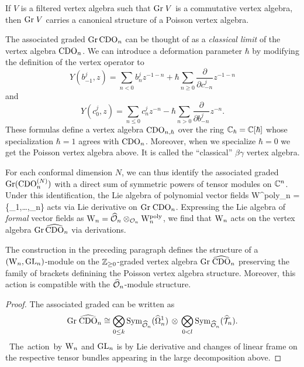 \begin{prop}
If $V$ is a filtered vertex algebra such that ${\rm Gr} \; V$ is a commutative vertex algebra,
then ${\rm Gr} \; V$ carries a canonical structure of a Poisson vertex algebra.
\end{prop}

\begin{rmk} 
The associated graded ${\rm Gr}\, {\rm CDO}_n$ can be thought of as a {\em classical limit} of the vertex algebra ${\rm CDO}_n$. 
We can introduce a deformation parameter $\hbar$ by modifying the definition of the vertex operator to
\[
Y(b^j_{-1},z) = \sum_{n < 0} b_n^j z^{-1-n} + \hbar \sum_{n \ge 0} \frac{\partial}{\partial c_{-n}^j} z^{-1-n} 
\]
and 
\[
Y(c_{0}^j,z) = \sum_{n \le 0} c^j_n z^{-n} - \hbar \sum_{n > 0}  \frac{\partial}{\partial b_{-n}^j} z^{-n}.
\]
These formulas define a vertex algebra ${\rm CDO}_{n,\hbar}$ over the ring $\mathbb C_\hbar = \mathbb C [ \hbar]$ whose specialization $\hbar = 1$ agrees with ${\rm CDO}_n$. 
Moreover, when we specialize $\hbar = 0$ we get the Poisson vertex algebra above. 
It is called the ``classical'' $\beta\gamma$ vertex algebra.
\end{rmk}

For each conformal dimension $N$, we can thus identify the associated graded ${\rm Gr}({\rm CDO}_n^{(N)})$ with a direct sum of symmetric powers of tensor modules on $\mathbb C^n$. Under this identification, the Lie algebra of polynomial vector fields 
\ben
{\rm W}^{\rm poly}_n = \CC[t^1,\ldots,t^n]\{\partial_1,\ldots,\partial_n\}
\een
acts via Lie derivative on ${\rm Gr} \; {\rm CDO}_n$. Expressing the Lie algebra of
{\em formal} vector fields as ${{\rm W}_n} = \widehat{\mathcal O}_n \otimes_{\mathcal O_n} {\rm
  W}_n^{\rm poly}$, we find that ${{\rm W}_n}$ acts on the vertex algebra
${\rm Gr} \, \widehat{\rm CDO}_n$ via derivations.

\begin{prop} \label{grcdo}
The construction in the preceding paragraph defines the structure of a $({{\rm W}_n}, {\rm GL}_n)$-module on the $\mathbb Z_{\geq 0}$-graded vertex algebra ${\rm Gr} \; \widehat{\rm CDO}_n$ preserving the family of brackets definining the Poisson vertex algebra structure. Moreover, this action is compatible with the $\widehat{\mathcal O}_n$-module structure. 
\end{prop}

\begin{proof} The associated graded can be written as \si 
\[
{\rm Gr} \; \widehat{\rm CDO}_n \cong
\underset{{0\leq k}}{\bigotimes} \,{\rm Sym}_{\widehat{\mathcal O}_n}(\widehat{\Omega}^1_n)\,
\otimes \, \underset{{0<
    l}}{\bigotimes} \,{\rm Sym}_{\widehat{\mathcal O}_n}(\widehat{\mathcal T}_n) .
\]
The action by ${{\rm W}_n}$ and ${\rm GL}_n$ is by Lie derivative and changes of
linear
frame on the respective tensor
bundles appearing in the large decomposition above. 
\end{proof}

